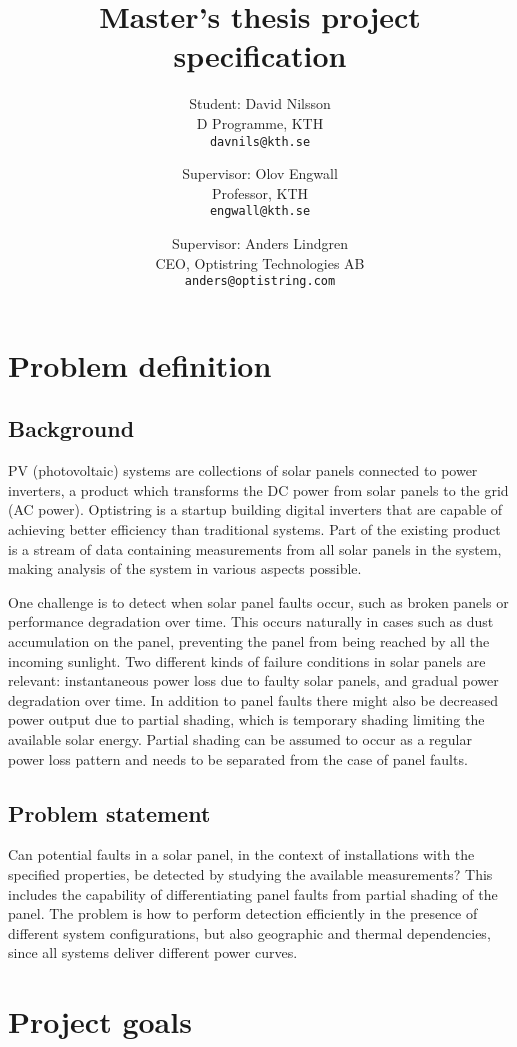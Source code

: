 \documentclass[a4paper,11pt]{article}
\title{Master's thesis project specification}
\author{
    Student: David Nilsson\\
    \small{D Programme, KTH}\\
    \small{\texttt{davnils@kth.se}}
    \and
    Supervisor: Olov Engwall\\
    \small{Professor, KTH}\\
    \small{\texttt{engwall@kth.se}}
    \and
    Supervisor: Anders Lindgren\\
    \small{CEO, Optistring Technologies AB}\\
    \small{\texttt{anders@optistring.com}}
}
\begin{document}
\maketitle

\section*{Problem definition}
\subsection*{Background}
PV (photovoltaic) systems are collections of solar panels connected to power
inverters, a product which transforms the DC power from solar panels to the grid (AC power).
Optistring is a startup building digital inverters that are capable of achieving
better efficiency than traditional systems.
Part of the existing product is a stream of data containing measurements from all
solar panels in the system, making analysis of the system in various aspects possible.

One challenge is to detect when solar panel faults occur, such as broken panels or performance degradation over time.
This occurs naturally in cases such as dust accumulation on the panel, preventing the panel from being reached by all the incoming sunlight.
Two different kinds of failure conditions in solar panels are relevant: instantaneous power loss due to faulty solar panels, and gradual power degradation over time.
In addition to panel faults there might also be decreased power output due to partial shading, which is temporary shading limiting the available solar energy.
Partial shading can be assumed to occur as a regular power loss pattern and needs to be separated from the case of panel faults.

\subsection*{Problem statement}
Can potential faults in a solar panel, in the context of installations with the specified properties, be detected by studying the available measurements?
This includes the capability of differentiating panel faults from partial shading of the panel.
The problem is how to perform detection efficiently in the presence of different system configurations, but also geographic and thermal dependencies, since all systems deliver different power curves.

\section*{Project goals}
\end{document}
